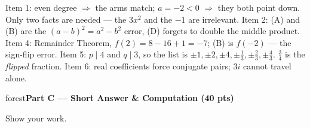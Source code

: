 \documentclass[10pt]{article}
\newcommand{\parthead}[1]{%
  \vspace{6pt}\noindent
  \begin{headlinebox}{forest}\color{white}\bfseries #1\end{headlinebox}%
  \vspace{4pt}}
\begin{document}
\begin{teachernote}
Item 1: even degree $\Rightarrow$ the arms match; $a=-2<0$ $\Rightarrow$ they both point down. Only two
facts are needed --- the $3x^2$ and the $-1$ are irrelevant. Item 2: (A) and (B) are the
$(a-b)^2=a^2-b^2$ error, (D) forgets to double the middle product. Item 4: Remainder Theorem,
$f(2)=8-16+1=-7$; (B) is $f(-2)$ --- the sign-flip error. Item 5: $p\mid 4$ and $q\mid 3$, so the
list is $\pm1,\pm2,\pm4,\pm\frac13,\pm\frac23,\pm\frac43$. $\frac34$ is the \emph{flipped} fraction.
Item 6: real coefficients force conjugate pairs; $3i$ cannot travel alone.
\end{teachernote}

\parthead{Part C --- Short Answer \& Computation (40 pts)}
Show your work.
\end{document}
